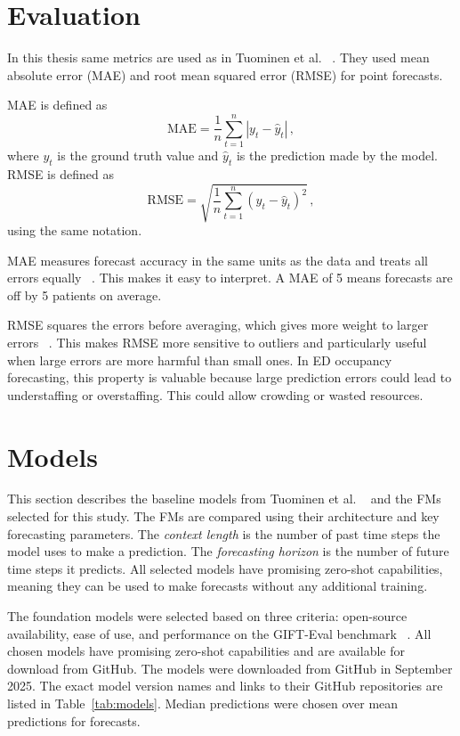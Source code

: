 \section{Evaluation}

In this thesis same metrics are used as in Tuominen et al. ~\cite{tuominen_forecasting_2024}.
They used mean absolute error (MAE) and root mean squared error (RMSE) for point forecasts.

MAE is defined as
\begin{equation}
\mathrm{MAE} = \frac{1}{n} \sum_{t=1}^{n} | y_t - \hat{y}_t | \, ,
\end{equation}
where $y_t$ is the ground truth value and $\hat{y}_t$ is the prediction made by the model. RMSE is defined as
\begin{equation}
\mathrm{RMSE} = \sqrt{ \frac{1}{n} \sum_{t=1}^{n} (y_t - \hat{y}_t)^2 } \, ,
\end{equation}
using the same notation.

MAE measures forecast accuracy in the same units as the data and treats all errors equally ~\cite{hyndman2018forecasting}.
This makes it easy to interpret. A MAE of 5 means forecasts are off by 5 patients on average.

RMSE squares the errors before averaging, which gives more weight to larger errors ~\cite{hyndman2018forecasting}.
This makes RMSE more sensitive to outliers and particularly useful when large errors are more harmful than small ones.
In ED occupancy forecasting, this property is valuable because large prediction errors could lead to understaffing or overstaffing. This could allow crowding or wasted resources.

\section{Models}
\label{sec:models}

This section describes the baseline models from Tuominen et al. ~\cite{tuominen_forecasting_2024} and the FMs selected for this study. The FMs are compared using their architecture and key forecasting parameters.
The \emph{context length} is the number of past time steps the model uses to make a prediction. The \emph{forecasting horizon} is the number of future time steps it predicts.
All selected models have promising zero-shot capabilities, meaning they can be used to make forecasts without any additional training.

The foundation models were selected based on three criteria: open-source availability, ease of use, and performance on the GIFT-Eval benchmark ~\cite{aksu2024giftevalbenchmarkgeneraltime}. 
All chosen models have promising zero-shot capabilities and are available for download from GitHub. The models were downloaded from GitHub in September 2025. The exact model version names and links to their GitHub repositories are listed in Table~\ref{tab:models}. Median predictions were chosen over mean predictions for forecasts.

